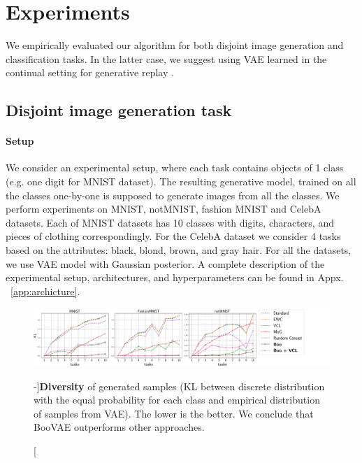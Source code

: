 \section{Experiments}
\label{exper}
We empirically evaluated our algorithm for both disjoint image generation and classification tasks. In the latter case, we suggest using VAE learned in the continual setting for generative replay \citep{shin2017continual}. 

\subsection{Disjoint image generation task}
\paragraph{Setup} We consider an experimental setup, where each task contains objects of 1 class (e.g. one digit for MNIST dataset). The resulting generative model, trained on all the classes one-by-one is supposed to generate images from all the classes. We perform experiments on MNIST, notMNIST, fashion MNIST and CelebA datasets. Each of MNIST datasets has 10 classes with digits, characters, and pieces of clothing correspondingly. For the CelebA dataset we consider 4 tasks based on the attributes: black, blond, brown, and gray hair. For all the datasets, we use VAE \citep{kingma2014autoencoding} model with Gaussian posterior. A complete description of the experimental setup, architectures, and hyperparameters can be found in Appx. ~\ref{app:archicture}. 

\begin{figure}[t]{}
		     \vspace*{-\baselineskip}
	\centering
		\includegraphics[width=1.1\textwidth]{pics/1_boovae/kl_mnists.pdf}
	\caption[][-\baselineskip]{\textbf{Diversity} of generated samples (KL between discrete distribution with the equal probability for each class and empirical distribution of samples from VAE). The lower is the better. We conclude that BooVAE outperforms other approaches.}\label{fig:online:diversity}
	     \vspace*{1.2\baselineskip}
 \end{figure}
 
